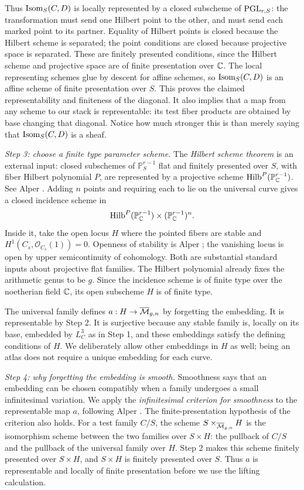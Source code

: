 Thus $\operatorname{Isom}_S(C,D)$ is locally represented by a closed subscheme
of $\operatorname{PGL}_{r,S}$: the transformation must send one Hilbert point
 to the other, and must send each marked point to its partner.
Equality of Hilbert points is closed because the Hilbert scheme
is separated; the point conditions are closed because projective
space is separated. These are finitely presented conditions, since
the Hilbert scheme and projective space are of finite presentation
over $\mathbb C$. The local
representing schemes glue by descent for affine schemes, so
$\operatorname{Isom}_S(C,D)$ is an affine scheme of finite presentation over $S$.
This proves the claimed representability and finiteness of the
diagonal. It also implies that a map from any scheme to our
stack is representable: its test fiber products are obtained by
base changing that diagonal. Notice how much stronger this is
than merely saying that $\operatorname{Isom}_S(C,D)$ is a sheaf.

\smallskip
\noindent\emph{Step 3: choose a finite type parameter scheme.}
The \emph{Hilbert scheme theorem} is an external input:
closed subschemes of $\mathbb P^{r-1}_S$ flat and finitely presented
over $S$, with fiber Hilbert polynomial $P$, are represented by a
projective scheme $\operatorname{Hilb}^{P}(\mathbb P^{r-1}_{\mathbb C})$.
See Alper \cite[Theorem 2.1.2, p.~48]{Alper}.
Adding $n$ points and requiring each to lie on the universal curve
gives a closed incidence scheme in
\[
 \operatorname{Hilb}^{P}(\mathbb P^{r-1}_{\mathbb C})
                      \times(\mathbb P^{r-1}_{\mathbb C})^n.
\]
Inside it, take the open locus $H$ where the pointed fibers are
stable and $H^1(C_s,\mathcal O_{C_s}(1))=0$.
Openness of stability is Alper
\cite[Proposition 6.3.24, p.~232]{Alper}; the vanishing locus is
open by upper semicontinuity of cohomology. Both are substantial
standard inputs about projective flat families. The Hilbert
polynomial already fixes the arithmetic genus to be $g$.
Since the incidence scheme is of finite type over the noetherian
field $\mathbb C$, its open subscheme $H$ is of finite type.

The universal family defines $a:H\to\overline{\mathcal M}_{g,n}$ by forgetting the
embedding. It is representable by Step 2. It is surjective because
any stable family is, locally on its base, embedded by $L_C^3$
as in Step 1, and these embeddings satisfy the defining conditions
of $H$. We deliberately allow other embeddings in $H$ as well;
being an atlas does not require a unique embedding for each curve.

\smallskip
\noindent\emph{Step 4: why forgetting the embedding is smooth.}
Smoothness says that an embedding can be chosen compatibly when a
family undergoes a small infinitesimal variation. We apply the
\emph{infinitesimal criterion for smoothness} to the representable
map $a$, following Alper
\cite[Theorem 4.7.1, pp.~144--145; proof of Theorem 6.4.6,
pp.~238--240]{Alper}. The finite-presentation hypothesis of the
criterion also holds. For a test family $C/S$, the scheme
$S\times_{\overline{\mathcal M}_{g,n}}H$ is the isomorphism scheme between the two
families over $S\times H$: the pullback of $C/S$ and the pullback
of the universal family over $H$. Step 2 makes this scheme
finitely presented over $S\times H$, and $S\times H$ is finitely
presented over $S$. Thus $a$ is representable and locally of finite
presentation before we use the lifting calculation.

